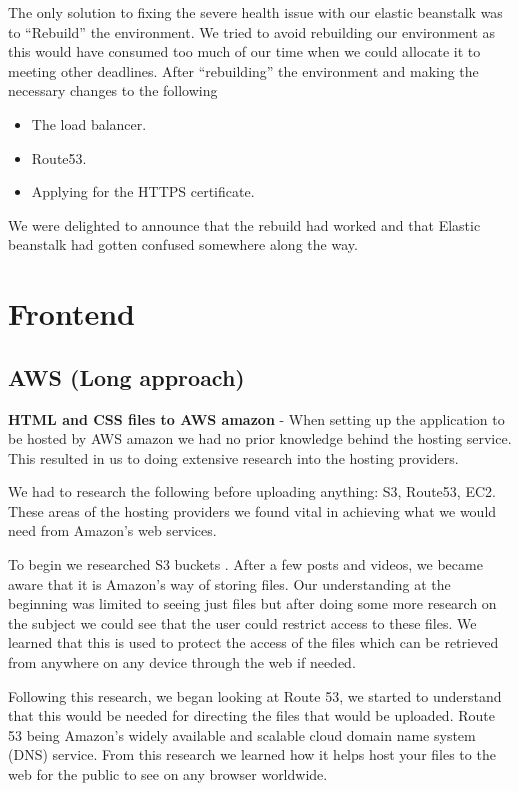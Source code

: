 The only solution to fixing the severe health issue with our elastic beanstalk was to “Rebuild” the environment. We tried to avoid rebuilding our environment as this would have consumed too much of our time when we could allocate it to meeting other deadlines.
After “rebuilding” the environment and making the necessary changes to the following

\begin{itemize}
  \item The load balancer.
  \item Route53.
  \item Applying for the HTTPS certificate. 
\end{itemize}

We were delighted to announce that the rebuild had worked and that Elastic beanstalk\cite{ref18} had gotten confused somewhere along the way.



\section{Frontend}
\subsection{AWS (Long approach)}

\textbf{HTML and CSS files to AWS amazon} - When setting up the application to be hosted by AWS amazon we had no prior knowledge behind the hosting service. This resulted in us to doing extensive research into the hosting providers.\hfill \break


We had to research the following before uploading anything: S3, Route53, EC2. These areas of the hosting providers we found vital in achieving what we would need from Amazon’s web services.\hfill \break


To begin we researched S3 buckets \cite{ref19}. After a few posts and videos, we became aware that it is Amazon’s way of storing files. Our understanding at the beginning was limited to seeing just files but after doing some more research on the subject we could see that the user could restrict access to these files. We learned that this is used to protect the access of the files which can be retrieved from anywhere on any device through the web if needed. \hfill \break


Following this research, we began looking at Route 53, we started to understand that this would be needed for directing the files that would be uploaded. Route 53 being Amazon's widely available and scalable cloud domain name system (DNS) service. From this research we learned how it helps host your files to the web for the public to see on any browser worldwide.


